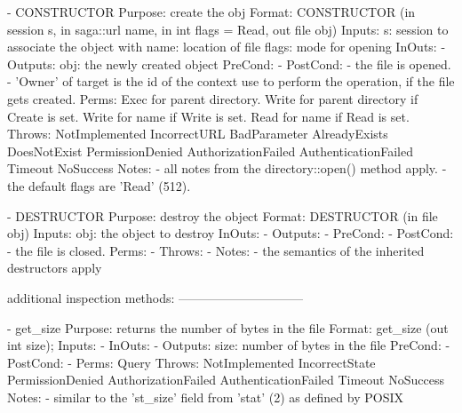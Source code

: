  
 \begin{myspec}
    - CONSTRUCTOR
      Purpose:  create the obj
      Format:   CONSTRUCTOR        (in  session   s,
                                    in  saga::url name,
                                    in  int       flags = Read,
                                    out file      obj)
      Inputs:   s:                  session to associate the
                                    object with
                name:               location of file
                flags:              mode for opening
      InOuts:   -
      Outputs:  obj:                the newly created object
      PreCond:  -
      PostCond: - the file is opened.
                - 'Owner' of target is the id of the context
                  use to perform the operation, if the file
                  gets created.
      Perms:    Exec  for parent directory.
                Write for parent directory if Create is set.
                Write for name if Write is set.
                Read  for name if Read  is set.
      Throws:   NotImplemented
                IncorrectURL
                BadParameter
                AlreadyExists
                DoesNotExist
                PermissionDenied
                AuthorizationFailed
                AuthenticationFailed
                Timeout
                NoSuccess
      Notes:    - all notes from the directory::open() method
                  apply.
                - the default flags are 'Read' (512).
 
 
    - DESTRUCTOR
      Purpose:  destroy the object
      Format:   DESTRUCTOR         (in  file      obj)
      Inputs:   obj:                the object to destroy
      InOuts:   -
      Outputs:  -
      PreCond:  -
      PostCond: - the file is closed.
      Perms:    - 
      Throws:   - 
      Notes:    - the semantics of the inherited destructors
                  apply
 
 
    additional inspection methods:
    ------------------------------
 
    - get_size
      Purpose:  returns the number of bytes in the file
      Format:   get_size           (out int     size);
      Inputs:   -
      InOuts:   -
      Outputs:  size:               number of bytes in the file
      PreCond:  -
      PostCond: -
      Perms:    Query
      Throws:   NotImplemented
                IncorrectState
                PermissionDenied
                AuthorizationFailed
                AuthenticationFailed
                Timeout
                NoSuccess
      Notes:    - similar to the 'st_size' field from 'stat' (2)
                  as defined by POSIX
 

\end{myspec}
